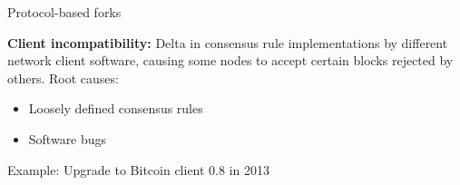 \documentclass[handout]{beamer}
\begin{document}
\begin{frame}{Protocol-based forks}

\textbf{Client incompatibility:} Delta in consensus rule implementations by different network client software, causing some nodes to accept certain blocks rejected by others. Root causes:
\begin{itemize}
	\item Loosely defined consensus rules
	\item Software bugs
\end{itemize}
\vspace{0.5em}
Example: Upgrade to Bitcoin client 0.8 in 2013
\vspace{1em}	


	
\end{frame}
\end{document}
